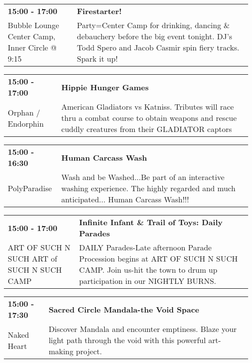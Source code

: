 \begin{tabular}{ p{1in} p{2.2in} }
    \textbf{15:00 - 17:00} & \textbf{Firestarter!} \\
    Bubble Lounge \newline Center Camp, Inner Circle @ 9:15 & Party=Center Camp for drinking, dancing \& debauchery before the big event tonight.  DJ's Todd Spero and Jacob Casmir spin fiery tracks. Spark it up! \\
    \hline 
\end{tabular}
    
\begin{tabular}{ p{1in} p{2.2in} }
    \textbf{15:00 - 17:00} & \textbf{Hippie Hunger Games} \\
    Orphan / Endorphin \newline  & American Gladiators vs Katniss. Tributes will race thru a combat course to obtain weapons and rescue cuddly creatures from their GLADIATOR captors \\
    \hline 
\end{tabular}
    
\begin{tabular}{ p{1in} p{2.2in} }
    \textbf{15:00 - 16:30} & \textbf{Human Carcass Wash} \\
    PolyParadise \newline  & Wash and be Washed...Be part of an interactive washing experience.
The highly regarded and much anticipated... Human Carcass Wash!!! \\
    \hline 
\end{tabular}
    
\begin{tabular}{ p{1in} p{2.2in} }
    \textbf{15:00 - 17:00} & \textbf{Infinite Infant \& Trail of Toys: Daily Parades} \\
    ART OF SUCH N SUCH \newline ART of SUCH N SUCH CAMP & DAILY Parades-Late afternoon
Parade Procession begins at ART OF SUCH N SUCH CAMP. Join us-hit the town to drum up participation in our NIGHTLY BURNS. \\
    \hline 
\end{tabular}
    
\begin{tabular}{ p{1in} p{2.2in} }
    \textbf{15:00 - 17:30} & \textbf{Sacred Circle Mandala-the Void Space} \\
    Naked Heart \newline  & Discover Mandala and encounter emptiness. Blaze your light path through the void with this powerful art-making project. \\
    \hline 
\end{tabular}
    

